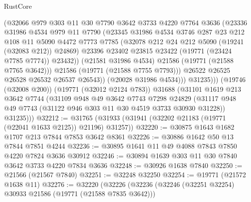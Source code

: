\begin{lexlean}{RustCore}
\begin{coremodule}
                      (@32066
                        @979
                        @303
                        @11
                        @30
                        @7790
                        @3642
                        @3733
                        @4220
                        @7764
                        @3636
                        (@23336
                          @31986
                          @4534
                          @979
                          @11
                          @7790
                          (@23345
                            @31986
                            @4534
                            @3746
                            @287
                            @23
                            @212
                            @108
                            @11
                            @5090
                            @4472
                            @7773
                            @7785
                            (@32078 @212 @24 @212 @5090 (@19241 (@32083 @212)) @24869)
                            @23396
                            @23402
                            @23815
                            @23422
                            (@19771 (@23424 @7785 @7774))
                            @23432))
                        (@21581 @31986 @4534)
                        @21586
                        (@19771 (@21588 @7765 @3642)))
                      @21586
                      (@19771 (@21588 @7755 @7793)))
                    @26522
                    @26525
                    @26528
                    @26532
                    @26537
                    @26543))
                (@20028 @31986 @4534)))
            @31235)))
      (@19746 (@32008 @200))
      (@19771 (@32012 @2124 @783))
      @31688
      (@31101
        @1619
        @213
        @3642
        @7744
        (@31109
          @948
          @49
          @3642
          @7743
          @7298
          @24829
          (@31117 @948 @49 @7743 (@31122 @946 @303 @11 @30 @4519 @3733 @30930 @31228))
          @31235)))
@32212 := @31765 (@31933 (@31941 (@32202 @21183 (@19771 (@22041 @1633 @2125)) @21196) @31257))
@32220 := @30875 @1643 @1682 @1707 @213 @7844 @7853 @3642 @8361
@32226 := @30886 @1642 @50 @13 @7844 @7851 @4244
@32236 := @30895 @1641 @11 @49 @4088 @7843 @7850 @4220 @7824 @3636 @30912
@32246 := @30894 @1639 @303 @11 @30 @7840 @3642 @3733 @4220 @7834 @3636
@32248 := @30926 @1638 @7840
@32250 := @21566 (@21567 @7840)
@32251 := @32248 @32250
@32254 := @19771 (@21572 @1638 @11)
@32276 := @32220
    (@32226
      (@32236
        (@32246 (@32251 @32254) @30933 @21586 (@19771 (@21588 @7835 @3642)))

\end{coremodule}
\end{lexlean}
